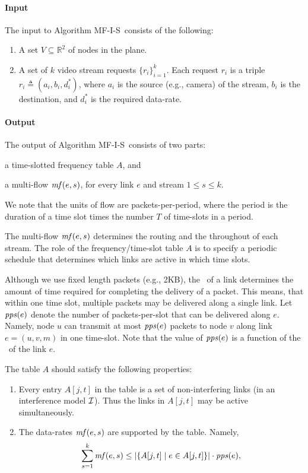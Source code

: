 \documentclass[12pt]{article}
\newenvironment{proof sketch}[1]{\noindent {\emph{Proof sketch of #1:}}}{\hfill \qed}
\newcommand{\eqdf}{\triangleq}
\newcommand{\pps}{\text{\emph{pps}}}
\newcommand{\mf}{\text{\emph{mf}}}
\newcommand{\MCS}{\text{\sc{mcs}}}
\newcommand{\RR}{\mathbb{R}}
\newcommand{\Imodel}{$\cal{I}$}
\newcommand{\algA}{\textsc{MF-I-S}}
\newcommand{\Alg}{\algA}
\begin{document}
\paragraph{Input}
The input to Algorithm \Alg\ consists of the following:
\begin{enumerate}
\item A set $V\subseteq \RR^2$  of nodes in the plane.
\item A set of $k$ video stream requests $\{r_i\}_{i=1}^k$. Each
  request $r_i$ is a triple $r_i\eqdf (a_i,b_i,d^*_i)$, where $a_i$ is
  the source (e.g., camera) of the stream, $b_i$ is the destination,
  and $d^*_i$ is the required data-rate.
\end{enumerate}
\paragraph{Output}
\label{sec:output}
The output of Algorithm \Alg\ consists of two parts:
\begin{inparaenum}[(i)]
\item a time-slotted frequency table $A$, and
\item a multi-flow $\mf(e,s)$, for every link $e$ and stream $1\leq
  s\leq k$.
\end{inparaenum}
We note that the units of flow are packets-per-period, where the
period is the duration of a time slot times the number $T$ of
time-slots in a period.

The multi-flow $\mf(e,s)$ determines the routing and the throughout of
each stream. The role of the frequency/time-slot table $A$ is to
specify a periodic schedule that determines which links are active in
which time slots.

Although we use fixed length packets (e.g., 2KB), the \MCS\ of a link
determines the amount of time required for completing the delivery of
a packet.  This means, that within one time slot, multiple packets may
be delivered along a single link.  Let $\pps(e)$ denote the number of
packets-per-slot that can be delivered along $e$.  Namely, node $u$
can transmit at most $\pps(e)$ packets to node $v$ along link
$e=(u,v,m)$ in one time-slot. Note that the value of $\pps(e)$ is a function of
the \MCS\ of the link $e$.

\medskip \noindent
The table $A$ should satisfy the following properties:
\begin{enumerate}
\item Every entry $A[j,t]$ in the table is a set of non-interfering
  links (in an interference model \Imodel). Thus the links in $A[j,t]$
  may be active simultaneously.
\item The data-rates $\mf(e,s)$ are supported by the table. Namely,
  \begin{align*}
    \sum_{s=1}^k \mf(e,s) \leq |\{A[j,t] \mid e\in A[j,t]\}|\cdot \pps(e),
  \end{align*}
\end{enumerate}
\end{document}
